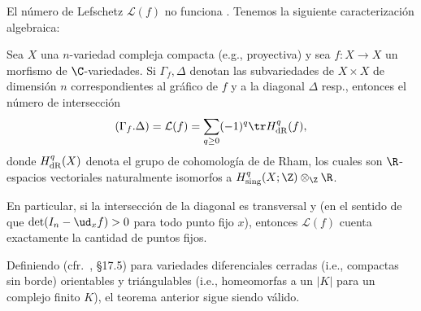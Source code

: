 \documentclass[11pt, reqno]{amsart}
\begin{document}
El número de Lefschetz $\mathcal{L}(f)$ no funciona .
Tenemos la siguiente caracterización algebraica:
\begin{thm}
	Sea $X$ una $n$-variedad compleja compacta (e.g., proyectiva) y sea $f \colon X \to X$ un morfismo de $\C$-variedades.
	Si $\Gamma_f, \Delta$ denotan las subvariedades de $X \times X$ de dimensión $n$ correspondientes al gráfico de $f$ y a la diagonal
	$\Delta$ resp., entonces el número de intersección
	\[
		(\Gamma_f.\Delta) = \mathcal{L}(f) = \sum_{q\ge 0} (-1)^q \tr H_{\rm dR}^q(f),
	\]
	donde $H_{\rm dR}^q(X)$ denota el grupo de cohomología de de Rham, los cuales son $\R$-espacios vectoriales naturalmente isomorfos a
	$H^q_{\rm sing}(X; \Z) \otimes_\Z \R$.
\end{thm}
En particular, si la intersección de la diagonal es transversal y  (en el sentido de que $\det(I_n - \ud_x f) > 0$ para
todo punto fijo $x$), entonces $\mathcal{L}(f)$ cuenta exactamente la cantidad de puntos fijos.

Definiendo  (cfr.\ \cite{fomenko:homotopical}, \S 17.5) para variedades diferenciales cerradas (i.e.,
compactas sin borde) orientables y triángulables (i.e., homeomorfas a un $|K|$ para un complejo finito $K$), el teorema anterior sigue
siendo válido.

\printbibliography
\end{document}
